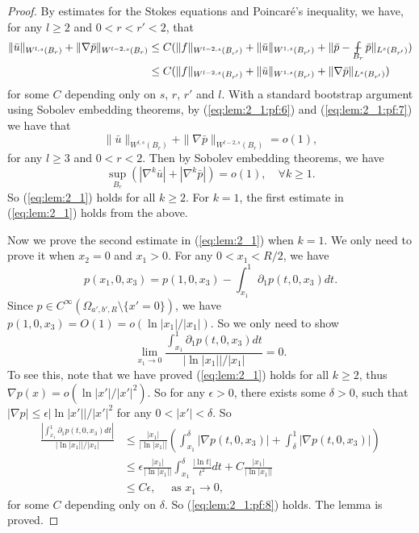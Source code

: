 \documentclass[12pt]{article}
\newcommand*{\avint}{\mathop{\ooalign{$\int$\cr$-$}}}
\begin{document}
\begin{proof}
	By estimates for the Stokes equations and Poincar\'{e}'s inequality, we have, for any $l\ge 2$ and $0<r<r'<2$, that
	\begin{equation}\label{eq:lem:2_1:pf:7}
	\begin{split}
		\|\bar{u}\|_{W^{l, s}(B_r)}+\|\nabla \bar{p}\|_{W^{l-2, s}(B_r)} & \le C(\|f\|_{W^{l-2, s}(B_{r'})}+\|\bar{u}\|_{W^{1, s}(B_{r'})}+\|\bar{p}-\avint_{B_r}\bar{p}\|_{L^s(B_{r'})}) \\
		& \le C(\|f\|_{W^{l-2, s}(B_{r'})}+\|\bar{u}\|_{W^{1, s}(B_{r'})}+\|\nabla \bar{p}\|_{L^s(B_{r'})}) 
	\end{split}
	\end{equation}
	for some $C$ depending only on $s$, $r$, $r'$ and $l$. With a standard bootstrap argument using Sobolev embedding theorems, by (\ref{eq:lem:2_1:pf:6}) and (\ref{eq:lem:2_1:pf:7}) we have that 
	\[
		\|\bar{u}\|_{W^{l, s}(B_r)}+\|\nabla \bar{p}\|_{W^{l-2, s}(B_r)}=o(1), 
	\]
	for any $l\ge 3$ and $0<r<2$. Then by Sobolev embedding theorems, we have 
	\begin{equation*}
		\sup_{B_{r}}(|\nabla^k \bar{u}|+|\nabla^k\bar{p}|)=o(1), \quad \forall k\ge 1. 
	\end{equation*}
	So (\ref{eq:lem:2_1}) holds for all $k\ge 2$. For $k=1$, the first estimate in (\ref{eq:lem:2_1}) holds from the above. 

	Now we prove the second estimate in (\ref{eq:lem:2_1}) when $k=1$. We only need to prove it when $x_2=0$ and $x_1>0$. For any $0<x_1<R/2$, we have 
	\[
		p(x_1, 0, x_3) =p(1, 0, x_3)-\int_{x_1}^{1}\partial_1p(t, 0, x_3)dt. 
	\]
	Since $p\in C^{\infty}(\Omega_{a', b', R}\setminus\{x'=0\})$, we have $p(1, 0, x_3)=O(1)=o(\ln |x_1|/|x_1|)$. So we only need to show 
	\begin{equation}\label{eq:lem:2_1:pf:8}
		\lim_{x_1\to 0}\frac{\int_{x_1}^{1}\partial_1 p(t, 0, x_3) dt }{\big| \ln |x_1| \big| / |x_1|}=0. 
	\end{equation}
	To see this, note that we have proved (\ref{eq:lem:2_1}) holds for all $k\ge 2$, thus $\nabla p(x)=o(\ln |x'|/|x'|^2)$. So for any $\epsilon>0$, there exists some $\delta>0$, such that $|\nabla p|\le \epsilon | \ln |x'| | / |x'|^2$ for any $0<|x'|<\delta$. So 
	\[
	\begin{split}
		\frac{|\int_{x_1}^{1}\partial_1p(t, 0, x_3)dt| }{| \ln |x_1| |/|x_1|} 
		& \le \frac{|x_1|}{| \ln |x_1| |}\left(\int_{x_1}^{\delta}|\nabla p(t, 0, x_3)|+\int_{\delta}^{1}|\nabla p(t, 0, x_3)|\right) \\
		& \le \epsilon \frac{|x_1|}{| \ln |x_1| |}\int_{x_1}^{\delta} \frac{| \ln t |}{ t^2}dt+C\frac{|x_1|}{| \ln |x_1| |} \\
		& \le C\epsilon, \quad \textrm{ as }x_1\to 0, 
	\end{split}
	\]
	for some $C$ depending only on $\delta$. So (\ref{eq:lem:2_1:pf:8}) holds. 
	The lemma is proved. 
\end{proof}
\end{document}
